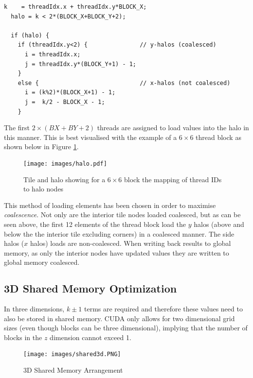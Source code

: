 \begin{spacing}{1.1}
\begin{verbatim}
k    = threadIdx.x + threadIdx.y*BLOCK_X;
  halo = k < 2*(BLOCK_X+BLOCK_Y+2);

  if (halo) {
    if (threadIdx.y<2) {               // y-halos (coalesced)
      i = threadIdx.x;
      j = threadIdx.y*(BLOCK_Y+1) - 1;
    }
    else {                             // x-halos (not coalesced)
      i = (k%2)*(BLOCK_X+1) - 1;
      j =  k/2 - BLOCK_X - 1;
    }
\end{verbatim}
\end{spacing}

The first $2 \times (BX + BY +2)$ threads are assigned to load values into the halo in this manner. This is best visualised with the example of a $6 \times 6$ thread block as shown below in Figure \ref{fig:haloloading}.

\begin{figure}[h]
	\centering
		\texttt{[image: images/halo.pdf]}
	\caption{Tile and halo showing for a $6 \times 6$ block the mapping of thread IDs to halo nodes}
	\label{fig:haloloading}
\end{figure}


This method of loading elements has been chosen in order to maximise \textit{coalescence}. Not only are the interior tile nodes loaded coalesced, but as can be seen above, the first 12 elements of the thread block load the $y$ halos (above and below the the interior tile excluding corners) in a coalesced manner. The side halos ($x$ halos) loads are non-coalesced. When writing back results to global memory, as only the interior nodes have updated values they are written to global memory coalesced.

\subsection{3D Shared Memory Optimization}


In three dimensions, $k\pm1$ terms are required and therefore these values need to also be stored in shared memory. CUDA only allows for two dimensional grid sizes (even though blocks can be three dimensional), implying that the number of blocks in the $z$ dimension cannot exceed 1.
 
\begin{figure}[h]
	\centering
		\texttt{[image: images/shared3d.PNG]}
	\caption{3D Shared Memory Arrangement}
	\label{fig:shared3d}
\end{figure}

